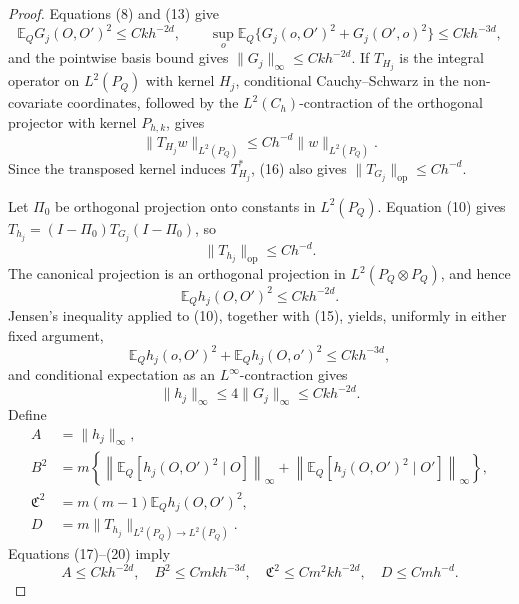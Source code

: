\documentclass{article}
\begin{document}
\begin{proof}
Equations (8) and (13) give
\[
 \mathbb E_QG_j(O,O')^2\le Ckh^{-2d},
 \qquad
 \sup_o\mathbb E_Q\{G_j(o,O')^2+G_j(O',o)^2\}
 \le Ckh^{-3d},
\tag{15}
\]
and the pointwise basis bound gives \(\|G_j\|_\infty\le Ckh^{-2d}\).  If \(T_{H_j}\) is the integral operator on \(L^2(P_Q)\) with kernel \(H_j\), conditional Cauchy--Schwarz in the non-covariate coordinates, followed by the \(L^2(C_h)\)-contraction of the orthogonal projector with kernel \(P_{h,k}\), gives
\[
 \|T_{H_j}w\|_{L^2(P_Q)}\le Ch^{-d}\|w\|_{L^2(P_Q)}.
\tag{16}
\]
Since the transposed kernel induces \(T_{H_j}^*\), (16) also gives \(\|T_{G_j}\|_{\mathrm{op}}\le Ch^{-d}\).

Let \(\Pi_0\) be orthogonal projection onto constants in \(L^2(P_Q)\).  Equation (10) gives \(T_{h_j}=(I-\Pi_0)T_{G_j}(I-\Pi_0)\), so
\[
 \|T_{h_j}\|_{\mathrm{op}}\le Ch^{-d}.
\tag{17}
\]
The canonical projection is an orthogonal projection in \(L^2(P_Q\otimes P_Q)\), and hence
\[
 \mathbb E_Qh_j(O,O')^2\le Ckh^{-2d}.
\tag{18}
\]
Jensen's inequality applied to (10), together with (15), yields, uniformly in either fixed argument,
\[
 \mathbb E_Qh_j(o,O')^2+\mathbb E_Qh_j(O,o')^2\le Ckh^{-3d},
\tag{19}
\]
and conditional expectation as an \(L^\infty\)-contraction gives
\[
 \|h_j\|_\infty\le4\|G_j\|_\infty\le Ckh^{-2d}.
\tag{20}
\]
Define
\[
 \begin{aligned}
 A&=\|h_j\|_\infty,\\
 B^2&=m\left\{\left\|\mathbb E_Q[h_j(O,O')^2\mid O]\right\|_\infty
               +\left\|\mathbb E_Q[h_j(O,O')^2\mid O']\right\|_\infty\right\},\\
 \mathfrak C^2&=m(m-1)\mathbb E_Qh_j(O,O')^2,\\
 D&=m\|T_{h_j}\|_{L^2(P_Q)\to L^2(P_Q)}.
 \end{aligned}
\]
Equations (17)--(20) imply
\[
 A\le Ckh^{-2d},\quad B^2\le Cmkh^{-3d},\quad
 \mathfrak C^2\le Cm^2kh^{-2d},\quad D\le Cmh^{-d}.
\tag{21}
\]


\end{proof}
\end{document}
